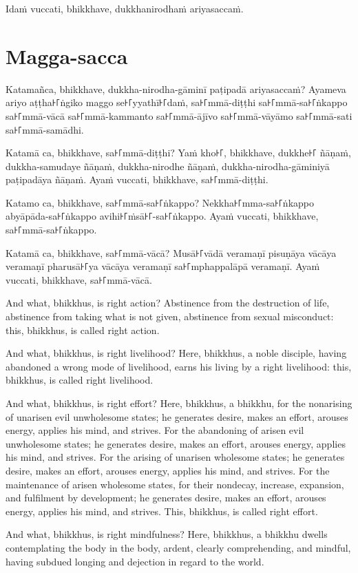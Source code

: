 Idaṁ vuccati, bhikkhave, dukkhanirodhaṁ ariyasaccaṁ.

\section*{Magga-sacca}

Katamañca, bhikkhave, dukkha-nirodha-gāminī paṭipadā ariyasaccaṁ? Ayameva ariyo
aṭṭha꜔꜒ṅgiko maggo se꜔꜒yyathī꜔꜒daṁ, sa꜔꜒mmā-diṭṭhi sa꜔꜒mmā-sa꜔꜒ṅkappo sa꜔꜒mmā-vācā
sa꜔꜒mmā-kammanto sa꜔꜒mmā-ājīvo sa꜔꜒mmā-vāyāmo sa꜔꜒mmā-sati sa꜔꜒mmā-samādhi.

Katamā ca, bhikkhave, sa꜔꜒mmā-diṭṭhi? Yaṁ kho꜔꜒, bhikkhave, dukkhe꜔꜒ ñāṇaṁ,
dukkha-samudaye ñāṇaṁ, dukkha-nirodhe ñāṇaṁ, dukkha-nirodha-gāminiyā paṭipadāya
ñāṇaṁ. Ayaṁ vuccati, bhikkhave, sa꜔꜒mmā-diṭṭhi.

Katamo ca, bhikkhave, sa꜔꜒mmā-sa꜔꜒ṅkappo? Nekkha꜔꜒mma-sa꜔꜒ṅkappo abyāpāda-sa꜔꜒ṅkappo
avihi꜔꜒ṁsā꜔꜒-sa꜔꜒ṅkappo. Ayaṁ vuccati, bhikkhave, sa꜔꜒mmā-sa꜔꜒ṅkappo.

Katamā ca, bhikkhave, sa꜔꜒mmā-vācā? Musā꜔꜒vādā veramaṇī pisuṇāya vācāya veramaṇī
pharusā꜔꜒ya vācāya veramaṇī sa꜔꜒mphappalāpā veramaṇī. Ayaṁ vuccati, bhikkhave,
sa꜔꜒mmā-vācā.

\englishPage

And what, bhikkhus, is right action? Abstinence from the destruction of life,
abstinence from taking what is not given, abstinence from sexual misconduct:
this, bhikkhus, is called right action.

And what, bhikkhus, is right livelihood? Here, bhikkhus, a noble disciple,
having abandoned a wrong mode of livelihood, earns his living by a right
livelihood: this, bhikkhus, is called right livelihood.

And what, bhikkhus, is right effort? Here, bhikkhus, a bhikkhu, for the
nonarising of unarisen evil unwholesome states; he generates desire, makes an
effort, arouses energy, applies his mind, and strives. For the abandoning of
arisen evil unwholesome states; he generates desire, makes an effort, arouses
energy, applies his mind, and strives. For the arising of unarisen wholesome
states; he generates desire, makes an effort, arouses energy, applies his mind,
and strives. For the maintenance of arisen wholesome states, for their nondecay,
increase, expansion, and fulfilment by development; he generates desire, makes
an effort, arouses energy, applies his mind, and strives. This, bhikkhus, is
called right effort.

And what, bhikkhus, is right mindfulness? Here, bhikkhus, a bhikkhu dwells
contemplating the body in the body, ardent, clearly comprehending, and mindful,
having subdued longing and dejection in regard to the world.

